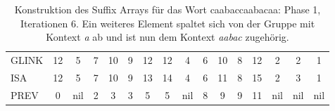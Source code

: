 \begin{table}[H]
\begin{adjustbox}{max width=\textwidth}
\begin{tabular}{lccccccccccccccc}
\multicolumn{1}{l|}{GLINK}   & 12                      & 5                         & 7                       & 10                                                 & 9                           & 12                        & 12                         & \cellcolor[HTML]{\red}4 & 6                         & 10 & 8                       & 12 & 2                         & 2                         & 1   \\
\multicolumn{1}{l|}{ISA}     & 12                      & 5                         & 7                       & 10                                                 & 9                           & 13                        & 14                         & \cellcolor[HTML]{\red}4 & 6                         & 11 & 8                       & 15 & \cellcolor[HTML]{\red}2 & \cellcolor[HTML]{\red}3 & 1   \\
\multicolumn{1}{l|}{PREV}    & 0                       & nil                       & 2                       & 3                                                  & 3                           & 5                         & 5                          & nil                       & \cellcolor[HTML]{\red}8 & 9  & 9                       & 11 & nil                       & nil                       & nil
\end{tabular}
\end{adjustbox}

\caption[Konstruktion des Suffix Arrays f{\"u}r das Wort caabaccaabacaa: Phase 1, Iterationen 6]{Konstruktion des Suffix Arrays f{\"u}r das Wort caabaccaabacaa: Phase 1, Iterationen 6. Ein weiteres Element spaltet sich von der Gruppe mit Kontext \textit{a} ab und ist nun dem Kontext \textit{aabac} zugeh{\"o}rig.}
\label{table_complex_example_1_6} 
\end{table}

